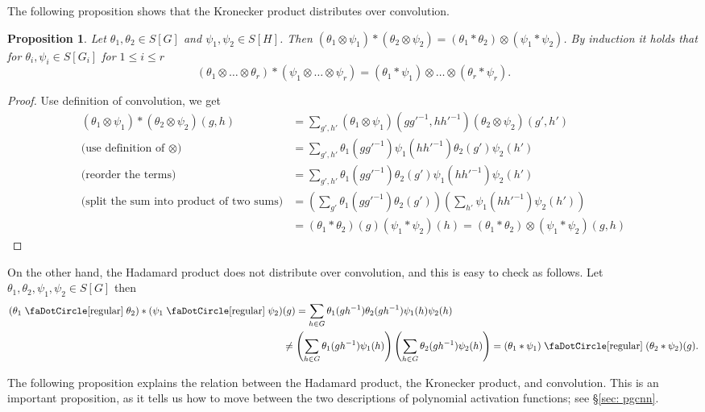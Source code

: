 \documentclass[final]{article}
\newcommand{\conv}{\ast}
\newcommand{\circbd}{\mathrel{\text{\faDotCircle[regular]}}}
\newcommand{\kprod}{\otimes}
\theoremstyle{definition}
\theoremstyle{plain}
\newtheorem{proposition}[definition]{Proposition}
\begin{document}
The following proposition shows that the Kronecker product distributes over convolution.
\begin{proposition}\label{prop: kprod_conv_kprod_=_conv_kprod_conv}
    Let $\theta_1, \theta_2 \in S[G]$  and $\psi_1, \psi_2 \in S[H]$. Then $(\theta_1 \kprod \psi_1) \conv (\theta_2 \kprod \psi_2) = (\theta_1 \conv \theta_2) \kprod (\psi_1 \conv \psi_2)$.
    By induction it holds that for $\theta_i, \psi_i \in S[G_i]$  for $1\leq i\leq r$
    \[
    (\theta_1 \kprod \hdots \kprod \theta_r) \conv (\psi_1 \kprod \hdots \kprod \psi_r) = (\theta_1 \conv \psi_1)\kprod \hdots \kprod (\theta_r \conv \psi_r).
    \]
\end{proposition}
\begin{proof}
Use definition of convolution, we get
    \begin{align*}
        (\theta_1 \kprod \psi_1) \conv (\theta_2 \kprod \psi_2)(g, h) &= \sum_{g', h'} (\theta_1 \kprod \psi_1)(g g'^{-1}, h h'^{-1}) (\theta_2 \kprod \psi_2)(g', h')\\
        \text{(use definition of $\kprod$)} &= \sum_{g', h'} \theta_1(g g'^{-1})\psi_1( h h'^{-1})\theta_2(g')\psi_2(h')\\
        \text{(reorder the terms)} &= \sum_{g', h'} \theta_1(g g'^{-1}) \theta_2(g')\psi_1( h h'^{-1})\psi_2(h')\\
        \text{(split the sum into product of two sums)} &= \left(\sum_{g'} \theta_1(g g'^{-1}) \theta_2(g')\right)\left( \sum_{h'}\psi_1( h h'^{-1})\psi_2(h')\right)\\
        &= (\theta_1 \conv \theta_2)(g) (\psi_1 \conv \psi_2)(h) = (\theta_1 \conv \theta_2) \kprod (\psi_1 \conv \psi_2) (g, h)
    \end{align*}
\end{proof}

On the other hand, the Hadamard product does not distribute over convolution, and this is easy to check as follows.
Let $\theta_1, \theta_2, \psi_1, \psi_2 \in S[G]$ then
\begin{align*}
        (\theta_1 \circbd \theta_2)\conv(\psi_1 \circbd \psi_2)&(g) = \sum_{h\in G}\theta_1(gh^{-1})\theta_2(gh^{-1})\psi_1(h)\psi_2(h)\\
        &\neq \left(\sum_{h\in G}\theta_1(gh^{-1})\psi_1(h)\right) \left(\sum_{h\in G}\theta_2(gh^{-1})\psi_2(h)\right) = (\theta_1 \conv \psi_1)\circbd (\theta_2 \conv \psi_2)(g).
\end{align*}

The following proposition explains the relation between the Hadamard product, the Kronecker product, and convolution.
This is an important proposition, as it tells us how to move between the two descriptions of polynomial activation functions; see §\ref{sec: pgcnn}.
\end{document}

